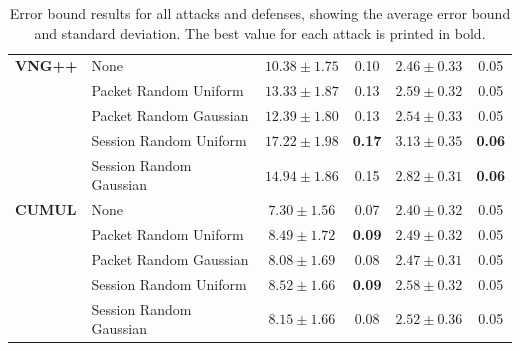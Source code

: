 \documentclass[
	ruledheaders=chapter,
	class=report,
	thesis={type=master, department=inf},
	accentcolor=1c,
	custommargins=true,
	marginpar=false,
	parskip=half-,
	fontsize=11pt,
]{tudapub}
\begin{document}
\begin{table}
\begin{tabular}{llcccc}
			\textbf{VNG++} & None & $10.38 \pm 1.75$ & 0.10 & $2.46 \pm 0.33$ & 0.05 \\
			 & Packet Random Uniform & $13.33\pm 1.87$ & 0.13 & $2.59 \pm 0.32$ & 0.05 \\
			 & Packet Random Gaussian & $12.39 \pm 1.80$ & 0.13 & $2.54 \pm 0.33$ & 0.05 \\
			 & Session Random Uniform & $\mathbf{17.22 \pm 1.98}$ & \textbf{0.17} & $\mathbf{3.13 \pm 0.35}$ & \textbf{0.06} \\
			 & Session Random Gaussian & $14.94\pm 1.86$ & 0.15 & $2.82 \pm 0.31$ & \textbf{0.06} \\ \addlinespace
			 
			\textbf{CUMUL} & None & $7.30 \pm 1.56$  & 0.07 & $2.40\pm 0.32$ & 0.05 \\
			 & Packet Random Uniform & $8.49 \pm 1.72$ & \textbf{0.09} & $2.49 \pm 0.32$ & 0.05 \\
			 & Packet Random Gaussian & $8.08 \pm 1.69$ & 0.08 & $2.47\pm 0.31$ & 0.05 \\
			 & Session Random Uniform & $\mathbf{8.52 \pm 1.66}$ & \textbf{0.09} & $\mathbf{2.58 \pm 0.32}$ & 0.05 \\
			 & Session Random Gaussian & $8.15 \pm 1.66$ & 0.08 & $2.52\pm 0.36$ & 0.05 \\
			\bottomrule
		\end{tabular}
		\caption[Error bound results for all attacks and defenses]{Error bound results for all attacks and defenses, showing the average error bound and standard deviation. The best value for each attack is printed in bold.}
		\label{tbl:error_bound}
	\end{table}
\end{document}
